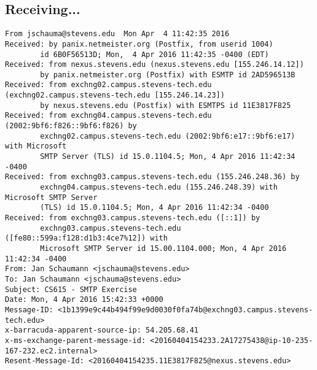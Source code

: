\documentclass[xga]{xdvislides}
\newcommand{\smallish}{\fontsize{16}{16}\selectfont}
\begin{document}
\subsection{Receiving...}
\smallish
\begin{verbatim}
From jschauma@stevens.edu  Mon Apr  4 11:42:35 2016
Received: by panix.netmeister.org (Postfix, from userid 1004)
        id 6B0F56513D; Mon,  4 Apr 2016 11:42:35 -0400 (EDT)
Received: from nexus.stevens.edu (nexus.stevens.edu [155.246.14.12])
        by panix.netmeister.org (Postfix) with ESMTP id 2AD596513B
Received: from exchng02.campus.stevens-tech.edu (exchng02.campus.stevens-tech.edu [155.246.14.23])
        by nexus.stevens.edu (Postfix) with ESMTPS id 11E3817F825
Received: from exchng04.campus.stevens-tech.edu (2002:9bf6:f826::9bf6:f826) by
        exchng02.campus.stevens-tech.edu (2002:9bf6:e17::9bf6:e17) with Microsoft
        SMTP Server (TLS) id 15.0.1104.5; Mon, 4 Apr 2016 11:42:34 -0400
Received: from exchng03.campus.stevens-tech.edu (155.246.248.36) by
        exchng04.campus.stevens-tech.edu (155.246.248.39) with Microsoft SMTP Server
        (TLS) id 15.0.1104.5; Mon, 4 Apr 2016 11:42:34 -0400
Received: from exchng03.campus.stevens-tech.edu ([::1]) by
        exchng03.campus.stevens-tech.edu ([fe80::599a:f128:d1b3:4ce7%12]) with
        Microsoft SMTP Server id 15.00.1104.000; Mon, 4 Apr 2016 11:42:34 -0400
From: Jan Schaumann <jschauma@stevens.edu>
To: Jan Schaumann <jschauma@stevens.edu>
Subject: CS615 - SMTP Exercise
Date: Mon, 4 Apr 2016 15:42:33 +0000
Message-ID: <1b1399e9c44b494f99e9d0030f0fa74b@exchng03.campus.stevens-tech.edu>
x-barracuda-apparent-source-ip: 54.205.68.41
x-ms-exchange-parent-message-id: <20160404154233.2A17275438@ip-10-235-167-232.ec2.internal>
Resent-Message-Id: <20160404154235.11E3817F825@nexus.stevens.edu>
\end{verbatim}
\end{document}

